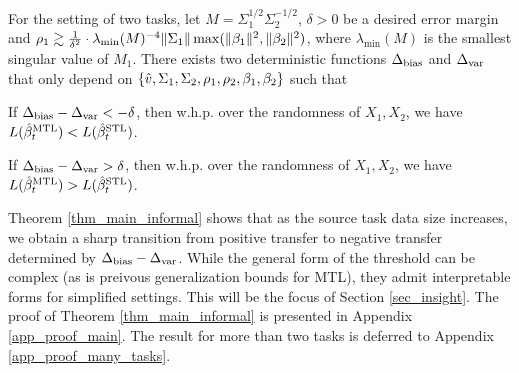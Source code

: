 \begin{theorem}\label{thm_main_informal}
	For the setting of two tasks, let $M=\Sigma_1^{1/2}\Sigma_2^{-1/2}$, $\delta > 0$ be a desired error margin and $\rho_1 \gtrsim \frac{1}{\delta^2}\cdot \lambda_{\min}(M)^{-4} \|\Sigma_1\| \max(\|\beta_1\|^2, \|\beta_2\|^2)$, where $\lambda_{\min}(M)$ is the smallest singular value of $M_1$.
	There exists two deterministic functions $\Delta_{\text{bias}}$ and $\Delta_{\text{var}}$ that only depend on $\{\hat{v}, \Sigma_1, \Sigma_2, \rho_1, \rho_2, \beta_1, \beta_2\}$ such that
	\squishlist
		\item If $\Delta_{\text{bias}} - \Delta_{\text{var}} < -\delta$, then w.h.p. over the randomness of $X_1, X_2$, we have $L(\hat{\beta}_t^{\text{MTL}}) < L(\hat{\beta}_t^{\text{STL}})$.
		\item If $\Delta_{\text{bias}} - \Delta_{\text{var}} > \delta$, then w.h.p. over the randomness of $X_1, X_2$, we have $L(\hat{\beta}_t^{\text{MTL}}) > L(\hat{\beta}_t^{\text{STL}})$.
	\squishend
\end{theorem}

Theorem \ref{thm_main_informal} shows that as the source task data size increases, we obtain a sharp transition from positive transfer to negative transfer determined by $\Delta_{\text{bias}} - \Delta_{\text{var}}$.
While the general form of the threshold can be complex (as is preivous generalization bounds for MTL), they admit interpretable forms for simplified settings.
This will be the focus of Section \ref{sec_insight}.
The proof of Theorem \ref{thm_main_informal} is presented in Appendix \ref{app_proof_main}.
The result for more than two tasks is deferred to Appendix \ref{app_proof_many_tasks}.

